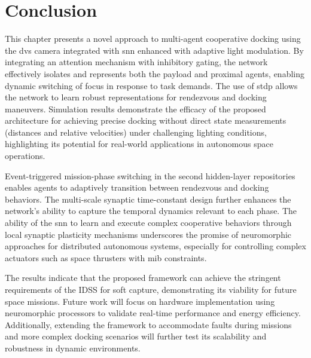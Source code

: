 \section{Conclusion}

This chapter presents a novel approach to multi-agent cooperative docking using the \ac{dvs} camera integrated with \ac{snn} enhanced with adaptive light modulation. By integrating an attention mechanism with inhibitory gating, the network effectively isolates and represents both the payload and proximal agents, enabling dynamic switching of focus in response to task demands. The use of \ac{stdp} allows the network to learn robust representations for rendezvous and docking maneuvers. Simulation results demonstrate the efficacy of the proposed architecture for achieving precise docking without direct state measurements (distances and relative velocities) under challenging lighting conditions, highlighting its potential for real-world applications in autonomous space operations.

Event-triggered mission-phase switching in the second hidden-layer repositories enables agents to adaptively transition between rendezvous and docking behaviors. The multi-scale synaptic time-constant design further enhances the network's ability to capture the temporal dynamics relevant to each phase. The ability of the \ac{snn} to learn and execute complex cooperative behaviors through local synaptic plasticity mechanisms underscores the promise of neuromorphic approaches for distributed autonomous systems, especially for controlling complex actuators such as space thrusters with \ac{mib} constraints.

The results indicate that the proposed framework can achieve the stringent requirements of the IDSS for soft capture, demonstrating its viability for future space missions. Future work will focus on hardware implementation using neuromorphic processors to validate real-time performance and energy efficiency. Additionally, extending the framework to accommodate faults during missions and more complex docking scenarios will further test its scalability and robustness in dynamic environments.
